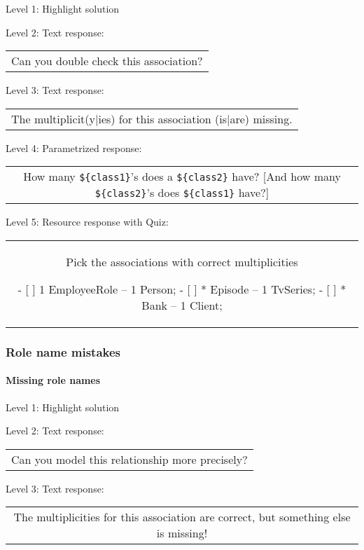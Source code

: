 \noindent Level 1: Highlight solution \medskip

\noindent Level 2: Text response: \medskip

\begin{tabular}{|c}
Can you double check this association?
\end{tabular} \medskip

\noindent Level 3: Text response: \medskip

\begin{tabular}{|c}
The multiplicit(y|ies) for this association (is|are) missing.
\end{tabular} \medskip

\noindent Level 4: Parametrized response: \medskip

\begin{tabular}{|c}
How many \verb|${class1}|'s does a \verb|${class2}| have? [And how many \verb|${class2}|'s does \verb|${class1}| have?]
\end{tabular} \medskip

\noindent Level 5: Resource response with Quiz:

\begin{tabular}{|c}
Pick the associations with correct multiplicities

- [ ] 1 EmployeeRole -- 1 Person;
- [ ] * Episode -- 1 TvSeries;
- [ ] * Bank -- 1 Client;
\end{tabular} \medskip


\subsubsection{Role name mistakes}

\paragraph{Missing role names}

\noindent Level 1: Highlight solution \medskip

\noindent Level 2: Text response: \medskip

\begin{tabular}{|c}
Can you model this relationship more precisely?
\end{tabular} \medskip

\noindent Level 3: Text response: \medskip

\begin{tabular}{|c}
The multiplicities for this association are correct, but something else is missing!
\end{tabular} \medskip

